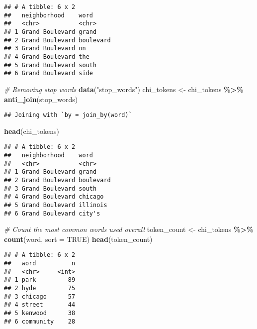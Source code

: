 \documentclass[
]{article}
\newenvironment{Shaded}{\begin{snugshade}}{\end{snugshade}}
\newcommand{\AttributeTok}[1]{\textcolor[rgb]{0.13,0.29,0.53}{#1}}
\newcommand{\CommentTok}[1]{\textcolor[rgb]{0.56,0.35,0.01}{\textit{#1}}}
\newcommand{\ConstantTok}[1]{\textcolor[rgb]{0.56,0.35,0.01}{#1}}
\newcommand{\FunctionTok}[1]{\textcolor[rgb]{0.13,0.29,0.53}{\textbf{#1}}}
\newcommand{\NormalTok}[1]{#1}
\newcommand{\OtherTok}[1]{\textcolor[rgb]{0.56,0.35,0.01}{#1}}
\newcommand{\SpecialCharTok}[1]{\textcolor[rgb]{0.81,0.36,0.00}{\textbf{#1}}}
\newcommand{\StringTok}[1]{\textcolor[rgb]{0.31,0.60,0.02}{#1}}
\begin{document}
\begin{verbatim}
## # A tibble: 6 x 2
##   neighborhood    word     
##   <chr>           <chr>    
## 1 Grand Boulevard grand    
## 2 Grand Boulevard boulevard
## 3 Grand Boulevard on       
## 4 Grand Boulevard the      
## 5 Grand Boulevard south    
## 6 Grand Boulevard side
\end{verbatim}

\begin{Shaded}
\begin{Highlighting}[]
\CommentTok{\# Removing stop words}
\FunctionTok{data}\NormalTok{(}\StringTok{"stop\_words"}\NormalTok{)}
\NormalTok{chi\_tokens }\OtherTok{\textless{}{-}}\NormalTok{ chi\_tokens }\SpecialCharTok{\%\textgreater{}\%}
  \FunctionTok{anti\_join}\NormalTok{(stop\_words)}
\end{Highlighting}
\end{Shaded}

\begin{verbatim}
## Joining with `by = join_by(word)`
\end{verbatim}

\begin{Shaded}
\begin{Highlighting}[]
\FunctionTok{head}\NormalTok{(chi\_tokens)}
\end{Highlighting}
\end{Shaded}

\begin{verbatim}
## # A tibble: 6 x 2
##   neighborhood    word     
##   <chr>           <chr>    
## 1 Grand Boulevard grand    
## 2 Grand Boulevard boulevard
## 3 Grand Boulevard south    
## 4 Grand Boulevard chicago  
## 5 Grand Boulevard illinois 
## 6 Grand Boulevard city's
\end{verbatim}

\begin{Shaded}
\begin{Highlighting}[]
\CommentTok{\# Count the most common words used overall}
\NormalTok{token\_count }\OtherTok{\textless{}{-}}\NormalTok{ chi\_tokens }\SpecialCharTok{\%\textgreater{}\%}
  \FunctionTok{count}\NormalTok{(word, }\AttributeTok{sort =} \ConstantTok{TRUE}\NormalTok{)}
\FunctionTok{head}\NormalTok{(token\_count)}
\end{Highlighting}
\end{Shaded}

\begin{verbatim}
## # A tibble: 6 x 2
##   word          n
##   <chr>     <int>
## 1 park         89
## 2 hyde         75
## 3 chicago      57
## 4 street       44
## 5 kenwood      38
## 6 community    28
\end{verbatim}
\end{document}
